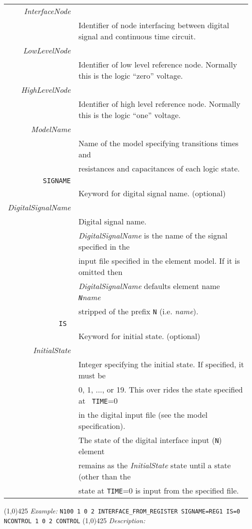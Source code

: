 \begin{tabular}{r l}
{\it InterfaceNode} & \\
     & Identifier of node interfacing between digital signal and
     continuous time circuit.\\
{\it LowLevelNode} & \\
     & Identifier of low level reference node. Normally this is the logic ``zero''
     voltage.\\
{\it HighLevelNode} & \\
     & Identifier of high level reference node. Normally this is the logic ``one''
     voltage.\\
{\it ModelName} & \\
     & Name of the model specifying transitions times and \\
     & resistances and capacitances of each logic state.\\
{\tt SIGNAME} & \\
     & Keyword for digital signal name. (optional)\\
{\it DigitalSignalName} & \\
     & Digital signal name.\\
     & {\it DigitalSignalName} is the name of the signal specified in
     the\\
     & input file specified in the element model. If it is omitted
     then\\
     & {\it DigitalSignalName} defaults element name {\it {\tt
     N}name}\\
     & stripped of the prefix {\tt N} (i.e. {\it name}).\\
{\tt IS } & \\
     & Keyword for initial state. (optional)\\
{\it InitialState} & \\
     & Integer specifying the initial state. If specified, it must
     be\\
     & 0, 1, ..., or 19. This over rides the state specified at {\tt
     TIME}=0\\
     & in the digital input file (see the model specification).\\
     & The state of the digital interface input ({\tt N})
     element\\
     & remains as the {\it InitialState} state until a state (other than
     the\\
     & state at {\tt TIME}=0 is input from the specified file.
\end{tabular}
\linethickness{0.5mm} \line(1,0){425}
\newline
\textit{Example:}
\newline
\texttt{N100 1 0 2 INTERFACE\_FROM\_REGISTER SIGNAME=REG1 IS=0 \\
    NCONTROL 1 0 2 CONTROL}
\newline
\linethickness{0.5mm} \line(1,0){425}
\newline
\textit{Description:}\\

